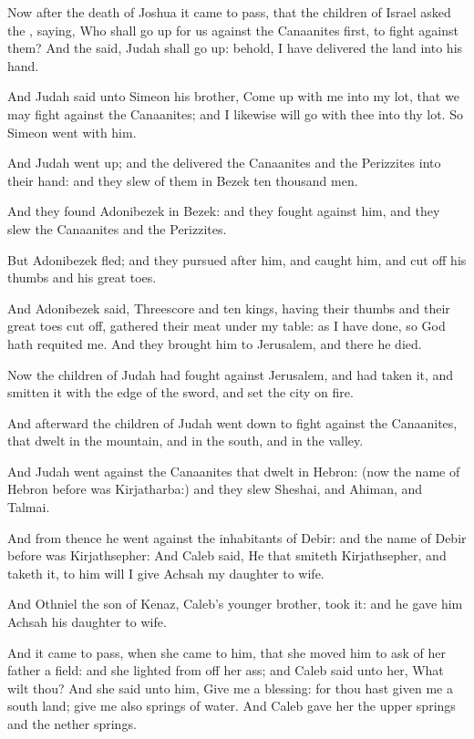 \Chapter
\Verse Now after the death of Joshua it came to pass, that the children of Israel asked the \LORD, saying, Who shall go up for us against the Canaanites first, to fight against them?  \Verse And the \LORD said, Judah shall go up: behold, I have delivered the land into his hand.

\Verse And Judah said unto Simeon his brother, Come up with me into my lot, that we may fight against the Canaanites; and I likewise will go with thee into thy lot. So Simeon went with him.

\Verse And Judah went up; and the \LORD delivered the Canaanites and the Perizzites into their hand: and they slew of them in Bezek ten thousand men.

\Verse And they found Adonibezek in Bezek: and they fought against him, and they slew the Canaanites and the Perizzites.

\Verse But Adonibezek fled; and they pursued after him, and caught him, and cut off his thumbs and his great toes.

\Verse And Adonibezek said, Threescore and ten kings, having their thumbs and their great toes cut off, gathered their meat under my table: as I have done, so God hath requited me. And they brought him to Jerusalem, and there he died.

\Verse Now the children of Judah had fought against Jerusalem, and had taken it, and smitten it with the edge of the sword, and set the city on fire.

\Verse And afterward the children of Judah went down to fight against the Canaanites, that dwelt in the mountain, and in the south, and in the valley.

\Verse And Judah went against the Canaanites that dwelt in Hebron: (now the name of Hebron before was Kirjatharba:) and they slew Sheshai, and Ahiman, and Talmai.

\Verse And from thence he went against the inhabitants of Debir: and the name of Debir before was Kirjathsepher: \Verse And Caleb said, He that smiteth Kirjathsepher, and taketh it, to him will I give Achsah my daughter to wife.

\Verse And Othniel the son of Kenaz, Caleb's younger brother, took it: and he gave him Achsah his daughter to wife.

\Verse And it came to pass, when she came to him, that she moved him to ask of her father a field: and she lighted from off her ass; and Caleb said unto her, What wilt thou?  \Verse And she said unto him, Give me a blessing: for thou hast given me a south land; give me also springs of water. And Caleb gave her the upper springs and the nether springs.

